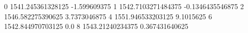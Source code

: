 0 1541.245361328125 -1.599609375
1 1542.7103271484375 -0.1346435546875
2 1546.582275390625 3.7373046875
4 1551.946533203125 9.1015625
6 1542.844970703125 0.0
8 1543.21240234375 0.367431640625
